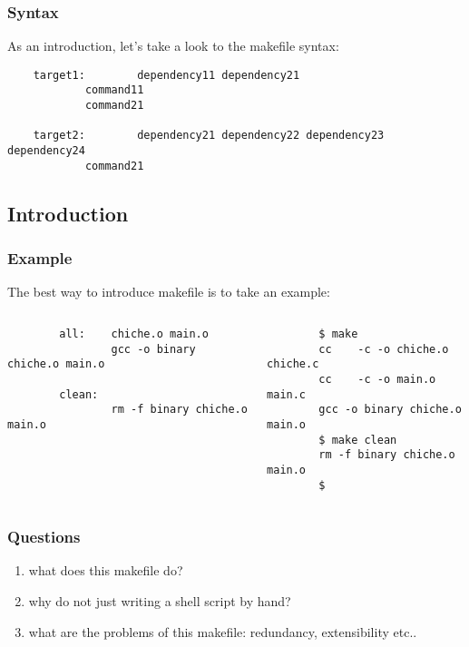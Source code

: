 \documentclass[8pt]{beamer}
\begin{document}

\begin{frame}[containsverbatim]
  \frametitle{Syntax}

  As an introduction, let's take a look to the makefile syntax:

  \begin{verbatim}
    target1:        dependency11 dependency21
            command11
            command21

    target2:        dependency21 dependency22 dependency23 dependency24
            command21
  \end{verbatim}
\end{frame}

%
%

\subsection{Introduction}


\begin{frame}[containsverbatim]
  \frametitle{Example}

  The best way to introduce makefile is to take an example:

  \begin{columns}

    \begin{column}{6cm}
      \begin{verbatim}
        all:    chiche.o main.o
                gcc -o binary chiche.o main.o

        clean:
                rm -f binary chiche.o main.o
      \end{verbatim}
    \end{column}

    \begin{column}{6cm}

      \begin{verbatim}
        $ make
        cc    -c -o chiche.o chiche.c
        cc    -c -o main.o main.c
        gcc -o binary chiche.o main.o
        $ make clean
        rm -f binary chiche.o main.o
        $ 
      \end{verbatim}
    \end{column}

  \end{columns}
\end{frame}


\begin{frame}
  \frametitle{Questions}

  \begin{enumerate}
    \item
      what does this makefile do?
    \item
      why do not just writing a shell script by hand?
    \item
      what are the problems of this makefile: redundancy, extensibility etc..
  \end{enumerate}
\end{frame}
\end{document}

